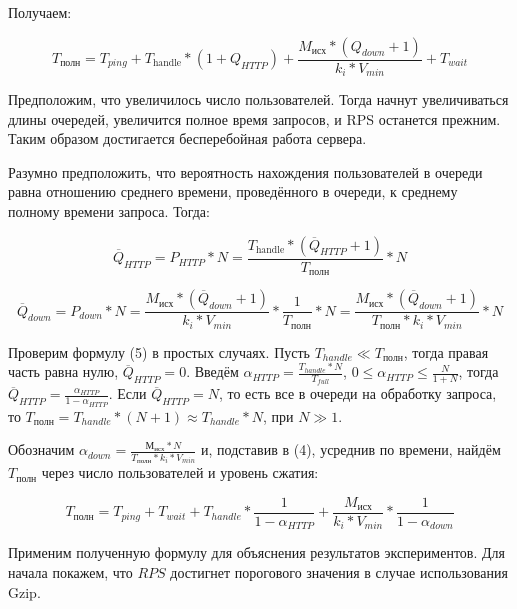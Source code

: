 \documentclass[12pt]{article}
\begin{document}
Получаем:

\[
    T_{\text{полн}} = T_{ping} + T_{\text{handle}}*(1 + Q_{HTTP}) + \frac{M_{\text{исх}}*(Q_{down} + 1)}{k_{i}*V_{min}} + T_{wait}
\]

Предположим, что увеличилось число пользователей. Тогда начнут увеличиваться длины очередей,
увеличится полное время запросов, и RPS останется прежним. Таким образом достигается бесперебойная работа сервера.

Разумно предположить, что вероятность нахождения пользователей в очереди равна отношению среднего времени, проведённого в очереди, к среднему полному времени запроса. Тогда:

\begin{equation}
    \overline{Q}_{HTTP} = P_{HTTP} * N = \frac{T_{\text{handle}} * (\overline{Q}_{HTTP} + 1)}{T_{\text{полн}}} * N
\end{equation}

\begin{equation}
    \overline{Q}_{down} = P_{down} * N = \frac{M_{\text{исх}}*(\overline{Q}_{down} + 1)}{k_{i}*V_{min}} * \frac{1}{T_{\text{полн}}} * N = \frac{M_{\text{исх}}*(\overline{Q}_{down} + 1)}{T_{\text{полн}} * k_{i}*V_{min}} * N
\end{equation}

\begin{spacing}{2.0}
    Проверим формулу (5) в простых случаях. Пусть $T_{handle} \ll T_{\text{полн}}$, тогда правая часть равна нулю, $\overline{Q}_{HTTP} = 0$.
    Введём $\alpha_{HTTP} = \frac{T_{handle} * N}{T_{full}}$, $0 \le \alpha_{HTTP} \le \frac{N}{1+N}$, тогда $\overline{Q}_{HTTP} = \frac{\alpha_{HTTP}}{1 - \alpha_{HTTP}}$.
    Если $\overline{Q}_{HTTP} = N$, то есть все в очереди на обработку запроса,
    то $T_{\text{полн}} = T_{handle}*(N+1) \approx T_{handle}*N$, при $N \gg 1$.
\end{spacing}

Обозначим $\alpha_{down} = \frac{М_{\text{исх}} * N}{T_{\text{полн}}*k_{i}*V_{min}}$ и, подставив в (4),
усреднив по времени, найдём $T_{\text{полн}}$ через число пользователей и уровень сжатия:

\begin{equation}
    T_{\text{полн}} = T_{ping} + T_{wait} + T_{handle}*\frac{1}{1 - \alpha_{HTTP}} + \frac{M_{\text{исх}}}{k_{i}*V_{min}} * \frac{1}{1 - \alpha_{down}}
\end{equation}

Применим полученную формулу для объяснения результатов экспериментов.
Для начала покажем, что $RPS$ достигнет порогового значения в случае использования Gzip.
\end{document}

